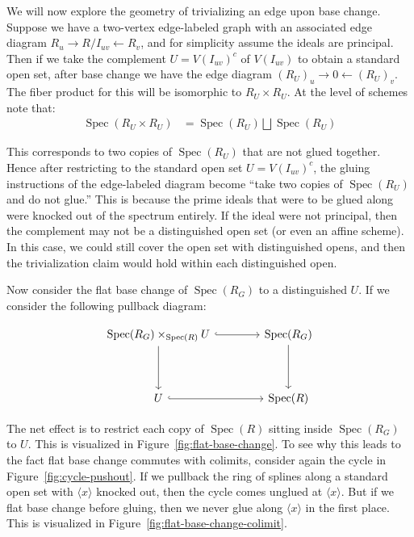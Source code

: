 \documentclass{article}
\DeclareMathOperator{\Spec}{Spec}
\begin{document}
We will now explore the geometry of trivializing an edge upon base change. Suppose we have a two-vertex edge-labeled graph with an associated edge diagram $R_u \rightarrow R/I_{uv} \leftarrow R_v$, and for simplicity assume the ideals are principal. Then if we take the complement $U = V(I_{uv})^c$ of $V(I_{uv})$ to obtain a standard open set, after base change we have the edge diagram $(R_U)_u \rightarrow 0 \leftarrow (R_U)_v$. The fiber product for this will be isomorphic to $R_U \times R_U$. At the level of schemes note that:
\begin{align*}
  \Spec(R_U \times R_U) &= \Spec(R_U) \bigsqcup \Spec(R_U)
\end{align*}

This corresponds to two copies of $\Spec(R_U)$ that are not glued together. Hence after restricting to the standard open set $U = V(I_{uv})^c$, the gluing instructions of the edge-labeled diagram become ``take two copies of $\Spec(R_U)$ and do not glue.'' This is because the prime ideals that were to be glued along were knocked out of the spectrum entirely. If the ideal were not principal, then the complement may not be a distinguished open set (or even an affine scheme). In this case, we could still cover the open set with distinguished opens, and then the trivialization claim would hold within each distinguished open.

Now consider the flat base change of $\Spec(R_{G})$ to a distinguished $U$. If we consider the following pullback diagram:

\[
\begin{tikzcd}[row sep=3.5em, column sep=4em]
\Spec(R_{G})\times_{\Spec(R)} U
  \arrow[r, hook, ""]
  \arrow[d, ""'] &
\Spec(R_{G}) \arrow[d, ""] \\[0.3em]
U \arrow[r, hook, ""'] &
\Spec(R)
\arrow[ul, phantom, very near start]
\end{tikzcd}
\]

The net effect is to restrict each copy of $\Spec(R)$ sitting inside $\Spec(R_{G})$ to $U$. This is visualized in Figure~\ref{fig:flat-base-change}. To see why this leads to the fact flat base change commutes with colimits, consider again the cycle in Figure~\ref{fig:cycle-pushout}. If we pullback the ring of splines along a standard open set with $\langle x \rangle$ knocked out, then the cycle comes unglued at $\langle x \rangle$. But if we flat base change before gluing, then we never glue along $\langle x \rangle$ in the first place. This is visualized in Figure~\ref{fig:flat-base-change-colimit}.
\end{document}
